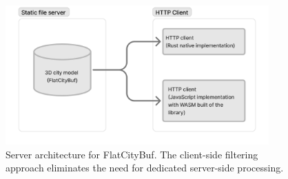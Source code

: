 \begin{figure}[htbp]
  \centering
  \includegraphics[width=0.9\textwidth]{figs/methodology/server_architecture.png}
  \caption{Server architecture for FlatCityBuf. The client-side filtering approach eliminates the need for dedicated server-side processing.}
  \label{fig:methodology:http_range_requests:server_architecture}
\end{figure}
